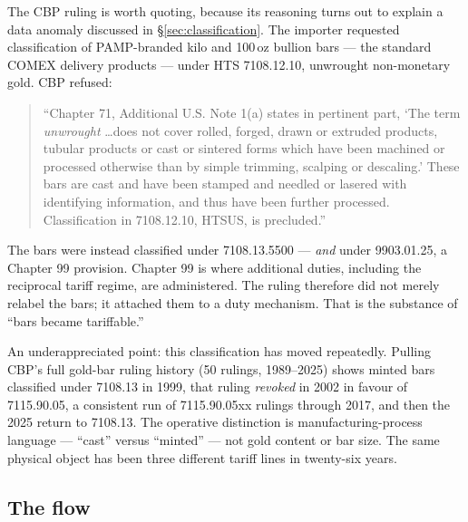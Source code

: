 \documentclass[11pt,a4paper]{article}
\begin{document}
The CBP ruling is worth quoting, because its reasoning turns out to explain a data anomaly
discussed in \S\ref{sec:classification}. The importer requested classification of PAMP-branded
kilo and 100\,oz bullion bars --- the standard COMEX delivery products --- under HTS
7108.12.10, unwrought non-monetary gold. CBP refused:

\begin{quote}
\small
``Chapter 71, Additional U.S. Note 1(a) states in pertinent part, `The term \emph{unwrought}
\ldots does not cover rolled, forged, drawn or extruded products, tubular products or cast or
sintered forms which have been machined or processed otherwise than by simple trimming,
scalping or descaling.' These bars are cast and have been stamped and needled or lasered with
identifying information, and thus have been further processed. Classification in 7108.12.10,
HTSUS, is precluded.''
\end{quote}

The bars were instead classified under 7108.13.5500 --- \emph{and} under 9903.01.25, a Chapter 99
provision. Chapter 99 is where additional duties, including the reciprocal tariff regime, are
administered. The ruling therefore did not merely relabel the bars; it attached them to a
duty mechanism. That is the substance of ``bars became tariffable.''

An underappreciated point: this classification has moved repeatedly. Pulling CBP's full gold-bar
ruling history (50 rulings, 1989--2025) shows minted bars classified under 7108.13 in 1999,
that ruling \emph{revoked} in 2002 in favour of 7115.90.05, a consistent run of 7115.90.05xx
rulings through 2017, and then the 2025 return to 7108.13. The operative distinction is
manufacturing-process language --- ``cast'' versus ``minted'' --- not gold content or bar size.
The same physical object has been three different tariff lines in twenty-six years.

\subsection{The flow}
\end{document}
